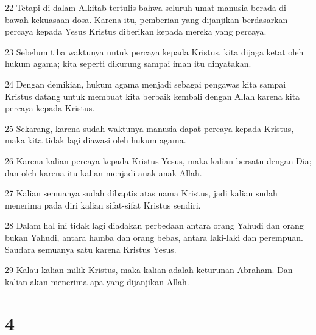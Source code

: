 \par 22 Tetapi di dalam Alkitab tertulis bahwa seluruh umat manusia berada di bawah kekuasaan dosa. Karena itu, pemberian yang dijanjikan berdasarkan percaya kepada Yesus Kristus diberikan kepada mereka yang percaya.
\par 23 Sebelum tiba waktunya untuk percaya kepada Kristus, kita dijaga ketat oleh hukum agama; kita seperti dikurung sampai iman itu dinyatakan.
\par 24 Dengan demikian, hukum agama menjadi sebagai pengawas kita sampai Kristus datang untuk membuat kita berbaik kembali dengan Allah karena kita percaya kepada Kristus.
\par 25 Sekarang, karena sudah waktunya manusia dapat percaya kepada Kristus, maka kita tidak lagi diawasi oleh hukum agama.
\par 26 Karena kalian percaya kepada Kristus Yesus, maka kalian bersatu dengan Dia; dan oleh karena itu kalian menjadi anak-anak Allah.
\par 27 Kalian semuanya sudah dibaptis atas nama Kristus, jadi kalian sudah menerima pada diri kalian sifat-sifat Kristus sendiri.
\par 28 Dalam hal ini tidak lagi diadakan perbedaan antara orang Yahudi dan orang bukan Yahudi, antara hamba dan orang bebas, antara laki-laki dan perempuan. Saudara semuanya satu karena Kristus Yesus.
\par 29 Kalau kalian milik Kristus, maka kalian adalah keturunan Abraham. Dan kalian akan menerima apa yang dijanjikan Allah.

\chapter{4}

